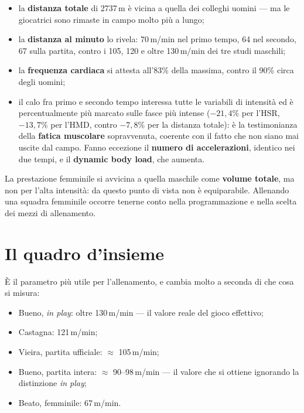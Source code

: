 \begin{itemize}
  \item la \textbf{distanza totale} di 2737\,m è vicina a quella dei colleghi uomini --- ma le
    giocatrici sono rimaste in campo molto più a lungo;
  \item la \textbf{distanza al minuto} lo rivela: 70\,m/min nel primo tempo, 64 nel secondo, 67
    sulla partita, contro i 105, 120 e oltre 130\,m/min dei tre studi maschili;
  \item la \textbf{frequenza cardiaca} si attesta all'83\% della massima, contro il 90\% circa degli
    uomini;
  \item il calo fra primo e secondo tempo interessa tutte le variabili di intensità ed è
    percentualmente più marcato sulle fasce più intense ($-21{,}4\%$ per l'HSR, $-13{,}7\%$ per
    l'HMD, contro $-7{,}8\%$ per la distanza totale): è la testimonianza della \textbf{fatica
    muscolare} sopravvenuta, coerente con il fatto che non siano mai uscite dal campo. Fanno
    eccezione il \textbf{numero di accelerazioni}, identico nei due tempi, e il \textbf{dynamic body
    load}, che aumenta.
\end{itemize}

La prestazione femminile si avvicina a quella maschile come \textbf{volume totale}, ma non per
l'alta intensità: da questo punto di vista non è equiparabile. Allenando una squadra femminile
occorre tenerne conto nella programmazione e nella scelta dei mezzi di allenamento.

\section{Il quadro d'insieme}

È il parametro più utile per l'allenamento, e cambia molto a seconda di che cosa si misura:
\begin{itemize}
  \item Bueno, \textit{in play}: oltre 130\,m/min --- il valore reale del gioco effettivo;
  \item Castagna: 121\,m/min;
  \item Vieira, partita ufficiale: $\approx$ 105\,m/min;
  \item Bueno, partita intera: $\approx$ 90--98\,m/min --- il valore che si ottiene ignorando la
    distinzione \textit{in play};
  \item Beato, femminile: 67\,m/min.
\end{itemize}


